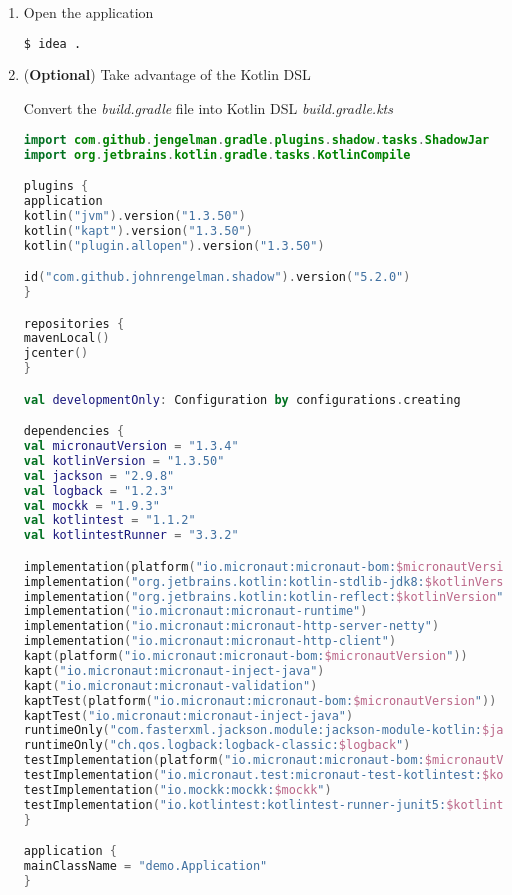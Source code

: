 \documentclass[12pt, letterpaper]{article}
\begin{document}
\begin{enumerate}

\item{ Open the application
\begin{lstlisting}[language=bash]
$ idea .
\end{lstlisting}
}

\item{ (\textbf{Optional}) Take advantage of the Kotlin DSL

Convert the \textit{build.gradle} file into Kotlin DSL \textit{build.gradle.kts}
\begin{lstlisting}[language=Kotlin]
import com.github.jengelman.gradle.plugins.shadow.tasks.ShadowJar
import org.jetbrains.kotlin.gradle.tasks.KotlinCompile

plugins {
application
kotlin("jvm").version("1.3.50")
kotlin("kapt").version("1.3.50")
kotlin("plugin.allopen").version("1.3.50")

id("com.github.johnrengelman.shadow").version("5.2.0")
}

repositories {
mavenLocal()
jcenter()
}

val developmentOnly: Configuration by configurations.creating

dependencies {
val micronautVersion = "1.3.4"
val kotlinVersion = "1.3.50"
val jackson = "2.9.8"
val logback = "1.2.3"
val mockk = "1.9.3"
val kotlintest = "1.1.2"
val kotlintestRunner = "3.3.2"

implementation(platform("io.micronaut:micronaut-bom:$micronautVersion"))
implementation("org.jetbrains.kotlin:kotlin-stdlib-jdk8:$kotlinVersion")
implementation("org.jetbrains.kotlin:kotlin-reflect:$kotlinVersion")
implementation("io.micronaut:micronaut-runtime")
implementation("io.micronaut:micronaut-http-server-netty")
implementation("io.micronaut:micronaut-http-client")
kapt(platform("io.micronaut:micronaut-bom:$micronautVersion"))
kapt("io.micronaut:micronaut-inject-java")
kapt("io.micronaut:micronaut-validation")
kaptTest(platform("io.micronaut:micronaut-bom:$micronautVersion"))
kaptTest("io.micronaut:micronaut-inject-java")
runtimeOnly("com.fasterxml.jackson.module:jackson-module-kotlin:$jackson")
runtimeOnly("ch.qos.logback:logback-classic:$logback")
testImplementation(platform("io.micronaut:micronaut-bom:$micronautVersion"))
testImplementation("io.micronaut.test:micronaut-test-kotlintest:$kotlintest")
testImplementation("io.mockk:mockk:$mockk")
testImplementation("io.kotlintest:kotlintest-runner-junit5:$kotlintestRunner")
}

application {
mainClassName = "demo.Application"
}


\end{lstlisting}}
\end{enumerate}
\end{document}
